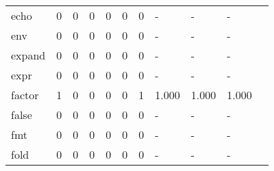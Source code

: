 \begin{longtable}{lp{1.10cm}p{1.10cm}p{1.10cm}p{1.10cm}p{1.10cm}p{1.10cm}p{1.10cm}p{1.10cm}p{1.10cm}p{1.10cm}}
echo      &                      0 &                                  0 &                                 0 &                                0 &                                 0 &                               0 &                              - &                                     - &                                   - \\
env       &                      0 &                                  0 &                                 0 &                                0 &                                 0 &                               0 &                              - &                                     - &                                   - \\
expand    &                      0 &                                  0 &                                 0 &                                0 &                                 0 &                               0 &                              - &                                     - &                                   - \\
expr      &                      0 &                                  0 &                                 0 &                                0 &                                 0 &                               0 &                              - &                                     - &                                   - \\
factor    &                      1 &                                  0 &                                 0 &                                0 &                                 0 &                               1 &                          1.000 &                                 1.000 &                               1.000 \\
false     &                      0 &                                  0 &                                 0 &                                0 &                                 0 &                               0 &                              - &                                     - &                                   - \\
fmt       &                      0 &                                  0 &                                 0 &                                0 &                                 0 &                               0 &                              - &                                     - &                                   - \\
fold      &                      0 &                                  0 &                                 0 &                                0 &                                 0 &                               0 &                              - &                                     - &                                   - \\

\end{longtable}
